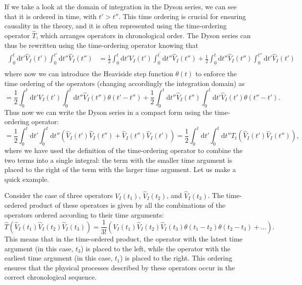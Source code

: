 If we take a look at the domain of integration in the Dyson series, we can see that it is ordered in time, with \(t' > t''\). This time ordering is crucial for ensuring causality in the theory, and it is often represented using the time-ordering operator \(\hat{T}\), which arranges operators in chronological order. The Dyson series can thus be rewritten using the time-ordering operator knowing that
\[
    \begin{aligned}
        \int_0^t \mathrm{d} t' \hat{V}_I(t') \int_0^{t'} \mathrm{d} t'' \hat{V}_I(t'') & = \frac{1}{2} \int_0^t \mathrm{d} t' V_I(t') \int_0^{t^{\prime}} \mathrm{d} t'' \hat{V}_I(t'') + \frac{1}{2} \int_0^t \mathrm{d} t'' \hat{V}_I(t'') \int_0^{t''} \mathrm{d} t' \hat{V}_I(t') \\
                                                                                       &
    \end{aligned}
\]
where now we can introduce the Heaviside step function \(\theta(t)\) to enforce the time ordering of the operators (changing accordingly the integration domain) as
\[
    =\frac{1}{2} \int_0^t \mathrm{d} t' V_I(t') \int_0^{t} \mathrm{d} t'' \hat{V}_I(t'') \theta(t' - t'') + \frac{1}{2} \int_0^t \mathrm{d} t'' \hat{V}_I(t'') \int_0^{t} \mathrm{d} t' \hat{V}_I(t') \theta(t'' - t').
\]
Thus now we can write the Dyson series in a compact form using the time-ordering operator:
\[
    =\frac{1}{2} \int_0^t \mathrm{d} t' \int_0^t \mathrm{d} t'' \left( \hat{V}_I(t') \hat{V}_I(t'') + \hat{V}_I(t'') \hat{V}_I(t') \right) = \frac{1}{2} \int_0^t \mathrm{d} t' \int_0^t \mathrm{d} t'' \hat{T}_t \left( \hat{V}_I(t') \hat{V}_I(t'') \right),
\]
where we have used the definition of the time-ordering operator to combine the two terms into a single integral: the term with the smaller time argument is placed to the right of the term with the larger time argument. Let us make a quick example.

\begin{example}
    Consider the case of three operators \(\hat{V}_I(t_1)\), \(\hat{V}_I(t_2)\), and \(\hat{V}_I(t_3)\). The time-ordered product of these operators is given by all the combinations of the operators ordered according to their time arguments:
    \[
        \hat{T} \left( \hat{V}_I(t_1) \hat{V}_I(t_2) \hat{V}_I(t_3) \right) = \frac{1}{3!} \left( V_I(t_1) \hat{V}_I(t_2) \hat{V}_I(t_3) \theta(t_1 - t_2) \theta(t_2 - t_3) + \dots \right).
    \]
    This means that in the time-ordered product, the operator with the latest time argument (in this case, \(t_3\)) is placed to the left, while the operator with the earliest time argument (in this case, \(t_1\)) is placed to the right. This ordering ensures that the physical processes described by these operators occur in the correct chronological sequence.
\end{example}

